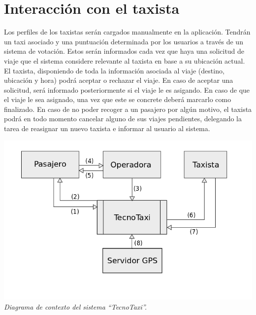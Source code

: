 \section{Interacción con el taxista}
Los perfiles de los taxistas serán cargados manualmente en la aplicación. Tendrán un taxi asociado y una puntuación determinada por los usuarios a través de un sistema de votación. Estos serán informados cada vez que haya una solicitud de viaje que el sistema considere relevante al taxista en base a su ubicación actual. El taxista, disponiendo de toda la información asociada al viaje (destino, ubicación y hora) podrá aceptar o rechazar el viaje. En caso de aceptar una solicitud, será informado posteriormente si el viaje le es asigando. En caso de que el viaje le sea asignado, una vez que este se concrete deberá marcarlo como finalizado. En caso de no poder recoger a un pasajero por algún motivo, el taxista podrá en todo momento cancelar alguno de sus viajes pendientes, delegando la tarea de reasignar un nuevo taxista e informar al usuario al sistema.

\vspace{\baselineskip}
        \begin{center}
		    \includegraphics[scale=0.60]{contexto.png}
		    \\
		    \vspace{1pt}
		    \footnotesize\textit{Diagrama de contexto del sistema “TecnoTaxi”.}
	    \end{center}
    \vspace{\baselineskip}
\par 


